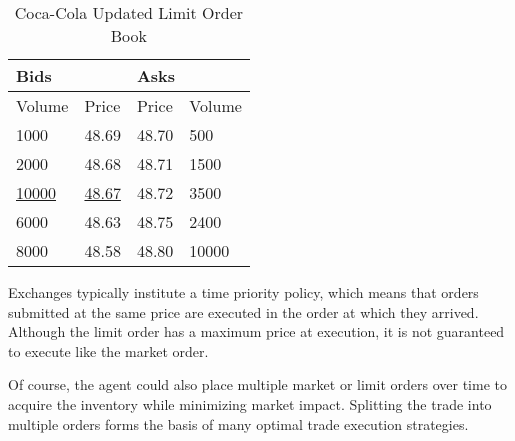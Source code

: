 \begin{table}[htbp]
\caption{Coca-Cola Updated Limit Order Book} \label{tab:coke2}
\begin{center}
\begin{tabular}{ll|ll}
\hline \hline
\multicolumn{2}{l|}{\textbf{Bids}} & \multicolumn{2}{l}{\textbf{Asks}} \\
\hline
Volume           & Price          & Price           & Volume          \\
\hline
1000             & 48.69          & 48.70           & 500             \\
2000             & 48.68          & 48.71           & 1500            \\
\underline{10000}             & \underline{48.67}          & 48.72           & 3500            \\
6000             & 48.63          & 48.75           & 2400            \\
8000             & 48.58          & 48.80           & 10000          
\end{tabular}
\end{center}
\end{table}

Exchanges typically institute a time priority policy, which means that orders submitted at the same price are executed in the order at which they arrived. Although the limit order has a maximum price at execution, it is not guaranteed to execute like the market order. 

Of course, the agent could also place multiple market or limit orders over time to acquire the inventory while minimizing market impact. Splitting the trade into multiple orders forms the basis of many optimal trade execution strategies.


